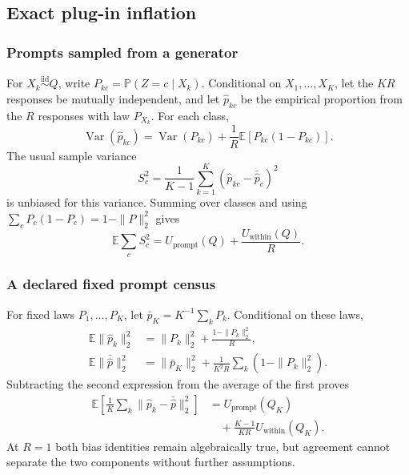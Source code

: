 \documentclass[letterpaper]{article}
\newcommand{\E}{\mathbb E}
\newcommand{\Prob}{\mathbb P}
\newcommand{\Var}{\operatorname{Var}}
\newcommand{\1}{\mathbf 1}
\newcommand{\Up}{U_{\mathrm{prompt}}}
\newcommand{\Uw}{U_{\mathrm{within}}}
\begin{document}
\subsection{Exact plug-in inflation}

\subsubsection{Prompts sampled from a generator}

For $X_k\stackrel{\mathrm{iid}}{\sim}Q$, write
$P_{kc}=\Prob(Z=c\mid X_k)$. Conditional on $X_1,\ldots,X_K$, let the $KR$
responses be mutually independent, and let $\widehat p_{kc}$ be the empirical
proportion from the $R$ responses with law $P_{X_k}$. For each class,
\begin{equation}
\Var(\widehat p_{kc})
=\Var(P_{kc})
+\frac1R\E[P_{kc}(1-P_{kc})].
\end{equation}
The usual sample variance
\[
S_c^2=\frac1{K-1}\sum_{k=1}^K
(\widehat p_{kc}-\bar{\widehat p}_c)^2
\]
is unbiased for this variance. Summing over classes and using
$\sum_cP_c(1-P_c)=1-\|P\|_2^2$ gives
\begin{equation}
\E\sum_cS_c^2
=\Up(Q)+\frac{\Uw(Q)}{R}.
\label{eq:s-sampled-bias}
\end{equation}

\subsubsection{A declared fixed prompt census}

For fixed laws $P_1,\ldots,P_K$, let
$\bar p_K=K^{-1}\sum_kP_k$. Conditional on these laws,
\begin{align}
\E\|\widehat p_k\|_2^2
&=\|P_k\|_2^2+\frac{1-\|P_k\|_2^2}{R},\\
\E\|\bar{\widehat p}\|_2^2
&=\|\bar p_K\|_2^2+
\frac1{K^2R}\sum_k(1-\|P_k\|_2^2).
\end{align}
Subtracting the second expression from the average of the first proves
\begin{equation}
\begin{aligned}
\E\left[\frac1K\sum_k
\|\widehat p_k-\bar{\widehat p}\|_2^2\right]
&=\Up(Q_K)\\
&\quad+\frac{K-1}{KR}\Uw(Q_K).
\end{aligned}
\label{eq:s-census-bias}
\end{equation}
At $R=1$ both bias identities remain algebraically true, but agreement cannot
separate the two components without further assumptions.
\end{document}
